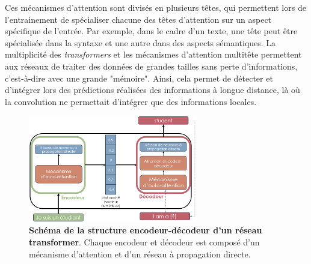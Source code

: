 Ces mécanismes d'attention sont divisés en plusieurs têtes, qui permettent lors de l'entrainement de spécialiser chacune des têtes d'attention sur un aspect spécifique de l'entrée. Par exemple, dans le cadre d'un texte, une tête peut être spécialisée dans la syntaxe et une autre dans des aspects sémantiques. 
La multiplicité des \textit{transformers} et les mécanismes d'attention multitête permettent aux réseaux de traiter des données de grandes tailles sans perte d'informations, c'est-à-dire avec une grande "mémoire". Ainsi, cela permet de détecter et d'intégrer lors des prédictions réalisées des informations à longue distance, là où la convolution ne permettait d'intégrer que des informations locales.

\begin{figure}[!htbp]
 \centering
 \includegraphics[width=0.66\textwidth]{figures/encoder_attention.png}
 \caption[Schéma de la structure encodeur-décodeur d'un réseau transformer]{\textbf{Schéma de la structure encodeur-décodeur d'un réseau transformer}. Chaque encodeur et décodeur est composé d'un mécanisme d'attention et d'un réseau à propagation directe.}
 \label{fig:encoder_attention}
\end{figure}

